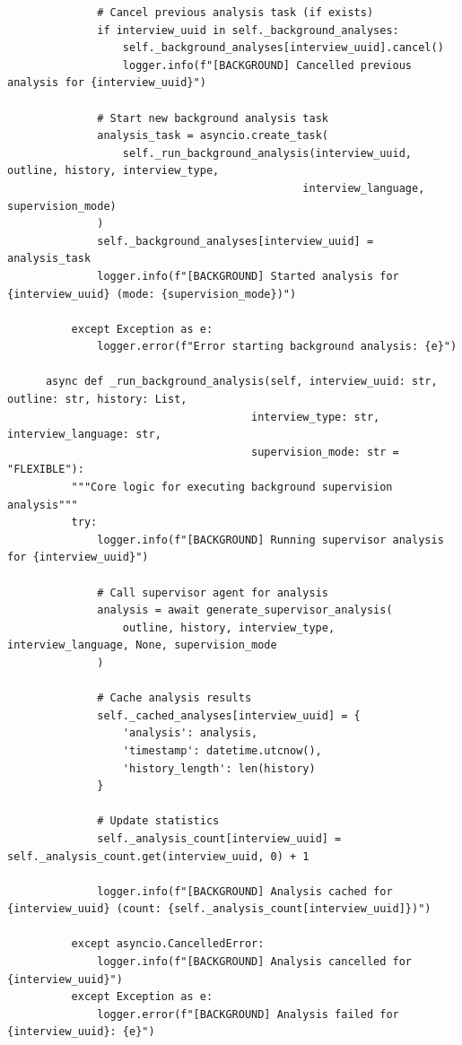 \documentclass[sigchi,nonacm,manuscript]{acmart}
\begin{document}
\begin{lstlisting}
              # Cancel previous analysis task (if exists)
              if interview_uuid in self._background_analyses:
                  self._background_analyses[interview_uuid].cancel()
                  logger.info(f"[BACKGROUND] Cancelled previous analysis for {interview_uuid}")
              
              # Start new background analysis task
              analysis_task = asyncio.create_task(
                  self._run_background_analysis(interview_uuid, outline, history, interview_type, 
                                              interview_language, supervision_mode)
              )
              self._background_analyses[interview_uuid] = analysis_task
              logger.info(f"[BACKGROUND] Started analysis for {interview_uuid} (mode: {supervision_mode})")
              
          except Exception as e:
              logger.error(f"Error starting background analysis: {e}")
      
      async def _run_background_analysis(self, interview_uuid: str, outline: str, history: List, 
                                      interview_type: str, interview_language: str, 
                                      supervision_mode: str = "FLEXIBLE"):
          """Core logic for executing background supervision analysis"""
          try:
              logger.info(f"[BACKGROUND] Running supervisor analysis for {interview_uuid}")
              
              # Call supervisor agent for analysis
              analysis = await generate_supervisor_analysis(
                  outline, history, interview_type, interview_language, None, supervision_mode
              )
              
              # Cache analysis results
              self._cached_analyses[interview_uuid] = {
                  'analysis': analysis,
                  'timestamp': datetime.utcnow(),
                  'history_length': len(history)
              }
              
              # Update statistics
              self._analysis_count[interview_uuid] = self._analysis_count.get(interview_uuid, 0) + 1
              
              logger.info(f"[BACKGROUND] Analysis cached for {interview_uuid} (count: {self._analysis_count[interview_uuid]})")
              
          except asyncio.CancelledError:
              logger.info(f"[BACKGROUND] Analysis cancelled for {interview_uuid}")
          except Exception as e:
              logger.error(f"[BACKGROUND] Analysis failed for {interview_uuid}: {e}")
      

\end{lstlisting}
\end{document}
